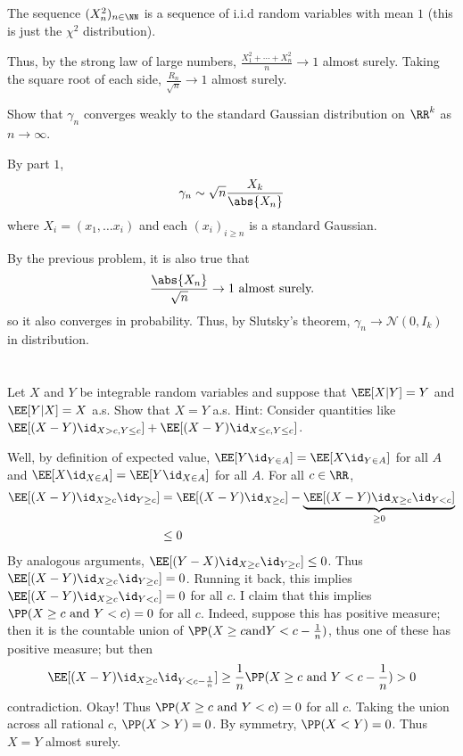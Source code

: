 \documentclass[11pt, headheight=30pt]{scrartcl}
\begin{document}
The sequence $(X^2_n)_{n \in \NN}$ is a sequence of i.i.d random variables
with mean $1$ (this is just the $\chi^2$ distribution).

Thus, by the strong law of large numbers, $\frac{X_1^2 + \cdots + X_n^2}{n} \to 1$
almost surely. Taking the square root of each side,
$\frac{R_n}{\sqrt{n}} \to 1$ almost surely.

\begin{prob}
    Show that $\gamma_n$ converges weakly to the standard
    Gaussian distribution on $\RR^k$ as $n \to \infty$.
\end{prob}
By part $1$,
\[
    \gamma_n \sim \sqrt{n} \frac{X_k}{\abs{X_n}}
\]
where $X_i = (x_1,\dots x_i)$ and each $(x_i)_{i\geq n}$ is a standard Gaussian.

By the previous problem, it is also true that
\[
    \frac{\abs{X_n}}{\sqrt{n}} \to 1 \text{ almost surely.}
\]
so it also converges in probability. Thus, by Slutsky's theorem,
$\gamma_n \to \mathcal{N}(0, I_k)$ in distribution.


\section{}
\setcounter{prob*}{6}
\begin{prob*}
    Let $X$ and $Y$ be integrable random variables and suppose that
    $\EE[X | Y ] = Y$ and $\EE[Y | X] = X$ a.s.
    Show that $X = Y$ a.s.
    Hint: Consider quantities like $\EE[(X - Y) \id_{X > c, Y \leq c}] + \EE[(X - Y) \id_{X \leq c, Y \leq c}]$.
\end{prob*}

Well, by definition of expected value, $\EE[Y \id_{Y\in A}] = \EE[X \id_{Y\in A}]$
for all $A$ and $\EE[X \id_{X\in A}] = \EE[Y \id_{X\in A}]$ for all $A$. For all $c\in \RR$,
\begin{align*}
    \EE[(X - Y)\id_{X\geq c}\id_{Y\geq c}] &= \EE[(X-Y)\id_{X\geq c}] - \underbrace{\EE[(X-Y)\id_{X\geq c}\id_{Y < c}]}_{\geq 0} \\
    & \leq 0
\end{align*}
By analogous arguments, $\EE[(Y - X)\id_{X\geq c}\id_{Y\geq c}] \leq 0$. Thus
$\EE[(X-Y)\id_{X\geq c}\id_{Y\geq c}] = 0$. Running it back, this implies
$\EE[(X - Y)\id_{X\geq c}\id_{Y < c}] = 0$ for all $c$. I claim that this implies
$\PP(X \geq c \text{ and } Y < c) = 0$ for all $c$. Indeed, suppose this has positive
measure; then it is the countable union of $\PP(X \geq c \text{and} Y < c - \frac{1}{n})$,
thus one of these has positive measure; but then
\[
    \EE[(X - Y)\id_{X\geq c}\id_{Y < c - \frac{1}{n}}] \geq \frac1n \PP(X \geq c \text{ and } Y < c - \frac{1}{n}) > 0   
\]
contradiction. Okay! Thus $\PP(X \geq c \text{ and } Y < c) = 0$ for all $c$. Taking
the union across all rational $c$, $\PP(X > Y) = 0$. By symmetry, $\PP(X < Y) = 0$.
Thus $X = Y$ almost surely.
\end{document}
